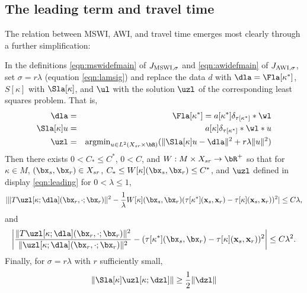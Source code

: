 \subsection{The leading term and travel time}

The relation between MSWI, AWI, and travel time emerges most clearly
through a further simplification:

\begin{prop}
  \label{thm:leading}
In the definitions \ref{eqn:mswidefmain} of $J_{\rm MSWI,\sigma}$ and
\ref{eqn:awidefmain} of $J_{\rm AWI,\sigma}$, set $\sigma = r\lambda$
(equation \ref{eqn:lamsig})
and replace the data $d$ with
$\dla = \Fla[\kappa^*]$, $S[\kappa]$ with $\Sla[\kappa]$, and $\ul$
with the solution $\uzl$ of the corresponding least squares problem. That is,
\begin{eqnarray}
  \label{eqn:leading}
  \dla & = & \Fla[\kappa^*] = a[\kappa^*]\delta_{\tau[\kappa^*]}*\wl
             \nonumber \\
  \Sla[\kappa]u &=& a[\kappa]\delta_{\tau[\kappa^*]}*\wl *u\nonumber
  \\
  \uzl &=& \mbox{argmin}_{u \in L^2(X_{sr} \times \bR)} (\|\Sla[\kappa]u-\dla\|^2 + r\lambda\|u\|^2)
\end{eqnarray}
Then there exists $0 < C_* \le C^*$, $0 < C$, and $W: M \times X_{sr}
\rightarrow \bR^+$ so that for
$\kappa \in M$, $(\bx_s,\bx_r) \in X_{sr}$, $C_* \le
W[\kappa](\bx_s,\bx_r) \le C^*$, and $\uzl$ defined in display
\ref{eqn:leading} for $0 < \lambda \le 1$, 
\begin{equation}
  \label{eqn:mswittz}
 | \|T\uzl[\kappa;\dla] (\bx_r,\cdot;\bx_r)\|^2- 
  \frac{1}{\lambda} W[\kappa](\bx_s,\bx_r) (\tau[\kappa^*]({\bf
  x}_s,{\bf x}_r)-\tau[\kappa]({\bf x}_s,{\bf x}_r))^2 | \le C\lambda,
\end{equation}
and
\begin{equation}
  \label{eqn:awittz}
  \left| \frac{\|T\uzl[\kappa;\dla] (\bx_r,\cdot;\bx_r)\|^2}{
        \|\uzl[\kappa;\dla] (\bx_r,\cdot;\bx_r)\|^2} - (\tau[\kappa^*](\bx_s,\bx_r)-\tau[\kappa]({\bf x}_s,{\bf x}_r))^2\right|  \le C\lambda^2.
\end{equation}
Finally, for $\sigma = r\lambda$ with $r$ sufficiently small,
\begin{equation}
  \label{eqn:Sutz}
  \|\Sla[\kappa]\uzl[\kappa;\dzl]\| \ge \frac{1}{2}\|\dzl\|
\end{equation}
\end{prop}


